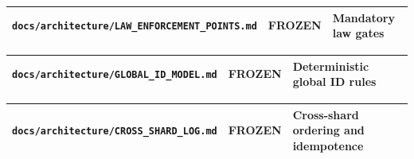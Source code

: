 \documentclass[9pt,a4paper,openany]{book}
\newcommand{\toprule}{\hline}
\newcommand{\midrule}{\hline}
\newcommand{\bottomrule}{\hline}
\begin{document}
\begin{center}
{\small\renewcommand{\arraystretch}{1.18}
\begin{tabularx}{\linewidth}{@{}>{\raggedright\arraybackslash}X >{\raggedright\arraybackslash}X >{\raggedright\arraybackslash}X@{}}
\toprule
\textbf{\texttt{docs/\allowbreak{}architecture/\allowbreak{}LAW\_\allowbreak{}ENFORCEMENT\_\allowbreak{}POINTS.\allowbreak{}md}} & \textbf{FROZEN} & \textbf{Mandatory law gates} \\
\midrule
\bottomrule
\end{tabularx}
}
\end{center}


\begin{center}
{\small\renewcommand{\arraystretch}{1.18}
\begin{tabularx}{\linewidth}{@{}>{\raggedright\arraybackslash}X >{\raggedright\arraybackslash}X >{\raggedright\arraybackslash}X@{}}
\toprule
\textbf{\texttt{docs/\allowbreak{}architecture/\allowbreak{}GLOBAL\_\allowbreak{}ID\_\allowbreak{}MODEL.\allowbreak{}md}} & \textbf{FROZEN} & \textbf{Deterministic global ID rules} \\
\midrule
\bottomrule
\end{tabularx}
}
\end{center}


\begin{center}
{\small\renewcommand{\arraystretch}{1.18}
\begin{tabularx}{\linewidth}{@{}>{\raggedright\arraybackslash}X >{\raggedright\arraybackslash}X >{\raggedright\arraybackslash}X@{}}
\toprule
\textbf{\texttt{docs/\allowbreak{}architecture/\allowbreak{}CROSS\_\allowbreak{}SHARD\_\allowbreak{}LOG.\allowbreak{}md}} & \textbf{FROZEN} & \textbf{Cross-\allowbreak{}shard ordering and idempotence} \\
\midrule
\bottomrule
\end{tabularx}
}
\end{center}
\end{document}
